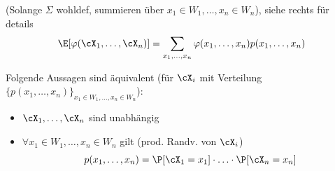  (Solange $\Sigma$ wohldef, summieren über $x_1 \in W_1, \ldots, x_n \in W_n$), siehe rechts für details
\[
    \E[\varphi(\cX_1, \ldots, \cX_n)] = \sum_{x_1, \ldots, x_n} \varphi(x_1, \ldots, x_n) p(x_1, \ldots, x_n)
\]

\shorttheorem Folgende Aussagen sind äquivalent (für $\cX_i$ mit Verteilung $\{p(x_1, \ldots, x_n)\}_{x_1 \in W_1, \ldots, x_n \in W_n}$):
\begin{itemize}
    \item $\cX_1, \ldots, \cX_n$ sind unabhängig
    \item $\forall x_1 \in W_1, \ldots, x_n \in W_n$ gilt (prod. Randv. von $\cX_i$)
          \[ p(x_1, \ldots, x_n) = \P[\cX_1 = x_1] \cdot \ldots \cdot \P[\cX_n = x_n] \]
\end{itemize}
